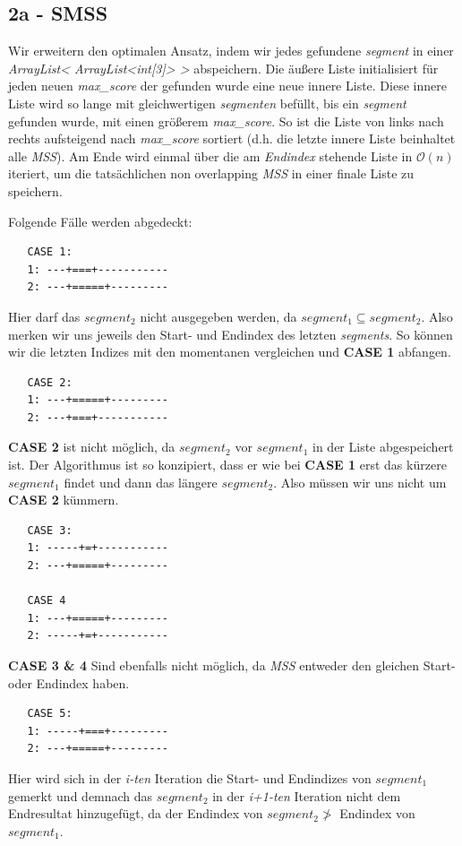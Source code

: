\documentclass[10pt]{article}
\begin{document}
\subsection{2a - SMSS}\label{2a}
Wir erweitern den optimalen Ansatz, indem wir jedes gefundene \textit{segment} in einer \textit{ArrayList< ArrayList<int[3]> >} abspeichern.
Die äu\ss ere Liste initialisiert für jeden neuen \textit{max\_score} der gefunden wurde eine neue innere Liste. Diese innere
Liste wird so lange mit gleichwertigen \textit{segmenten} befüllt, bis ein \textit{segment} gefunden wurde, mit einen grö\ss erem
\textit{max\_score}. So ist die Liste von links nach rechts aufsteigend nach \textit{max\_score} sortiert (d.h. die letzte innere Liste beinhaltet alle \textit{MSS}).
Am Ende wird einmal über die am \textit{Endindex} stehende Liste in $\mathcal{O}(n)$ iteriert, um die tatsächlichen non overlapping
\textit{MSS} in einer finale Liste zu speichern.

Folgende Fälle werden abgedeckt: \\
\begin{verbatim} 
   CASE 1:
   1: ---+===+-----------
   2: ---+=====+---------
\end{verbatim}
Hier darf das $segment_{2}$ nicht ausgegeben werden, da $segment_{1} \subseteq segment_2$. Also merken wir uns
jeweils den Start- und Endindex des letzten \textit{segments}. So können wir die letzten Indizes mit den 
momentanen vergleichen und \textbf{CASE 1} abfangen. 

\begin{verbatim}
   CASE 2:
   1: ---+=====+---------
   2: ---+===+-----------
\end{verbatim}
\textbf{CASE 2} ist nicht möglich, da $segment_{2}$ vor $segment_{1}$ in der Liste abgespeichert ist.
Der Algorithmus ist so konzipiert, dass er wie bei \textbf{CASE 1} erst das kürzere $segment_{1}$ findet und dann das
längere $segment_{2}$. Also müssen wir uns nicht um \textbf{CASE 2} kümmern.
\begin{verbatim}
   CASE 3:
   1: -----+=+-----------
   2: ---+=====+---------

   CASE 4
   1: ---+=====+---------
   2: -----+=+-----------
\end{verbatim}
\textbf{CASE 3 \& 4} Sind ebenfalls nicht möglich, da \textit{MSS} entweder den gleichen Start- oder Endindex haben.

\begin{verbatim} 
   CASE 5:
   1: -----+===+---------
   2: ---+=====+---------
\end{verbatim}
Hier wird sich in der \textit{i-ten} Iteration die Start- und Endindizes von $segment_{1}$ gemerkt
und demnach das $segment_{2}$ in der \textit{i+1-ten} Iteration nicht dem Endresultat hinzugefügt,
da der Endindex von $segment_2 \not >$  Endindex von $segment_1$.
\end{document}
